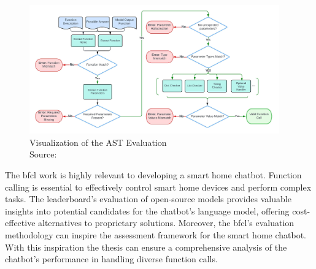 \begin{figure}[h]
  \centering
  \captionsetup{justification=centering}
  \includegraphics[width=0.96\textwidth]{graphics/bfcl-ast.jpeg}
  \caption{Visualization of the AST Evaluation\\Source: \citet{berkeley-function-calling-leaderboard}}
  \label{fig:ast}
\end{figure}

The \gls{bfcl} work is highly relevant to developing a smart home chatbot. 
Function calling is essential to effectively control smart home devices and perform complex tasks. 
The leaderboard's evaluation of open-source models provides valuable insights into potential candidates for the chatbot's language model, offering cost-effective alternatives to proprietary solutions. 
Moreover, the \gls{bfcl}'s evaluation methodology can inspire the assessment framework for the smart home chatbot. 
With this inspiration the thesis can ensure a comprehensive analysis of the chatbot's performance in handling diverse function calls.